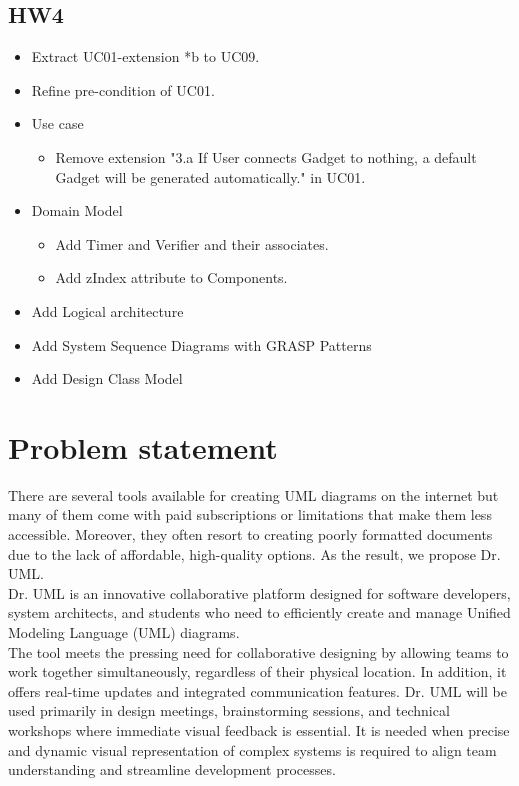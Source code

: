 \documentclass[12pt]{article}
\begin{document}
\subsection{HW4}
\begin{itemize}
    \item Extract UC01-extension *b to UC09.
    \item Refine pre-condition of UC01.
    \item Use case
    \begin{itemize}
        \item Remove extension "3.a If User connects Gadget to nothing, a default Gadget will be generated automatically." in UC01.
    \end{itemize}
    \item Domain Model
    \begin{itemize}
        \item Add Timer and Verifier and their associates.
        \item Add zIndex attribute to Components.
    \end{itemize}
    \item Add Logical architecture
    \item Add System Sequence Diagrams with GRASP Patterns
    \item Add Design Class Model
\end{itemize}


\section{Problem statement}


There are several tools available for creating UML diagrams on the internet but many of them come with paid subscriptions or limitations that make them less accessible. Moreover, they often resort to creating poorly formatted documents due to the lack of affordable, high-quality options. As the result, we propose Dr. UML.\\

Dr. UML is an innovative collaborative platform designed for software developers, system architects, and students who need to efficiently create and manage Unified Modeling Language (UML) diagrams.\\

The tool meets the pressing need for collaborative designing by allowing teams to work together simultaneously, regardless of their physical location. In addition, it offers real-time updates and integrated communication features. Dr. UML will be used primarily in design meetings, brainstorming sessions, and technical workshops where immediate visual feedback is essential. It is needed when precise and dynamic visual representation of complex systems is required to align team understanding and streamline development processes.\\
\end{document}
